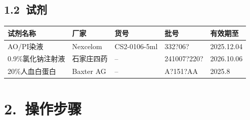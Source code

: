 \documentclass[UTF8,10pt,a4paper,fontset=fandol]{ctexart}
\newcommand{\fieldvalue}[1]{#1}
\newcommand{\handwritten}[1]{#1}
\begin{document}
\begin{center}
\begin{center}
\subsection*{1.2\ 试剂}

\noindent
\small
\begin{tabularx}{\textwidth}{|p{3.0cm}|p{2.4cm}|p{2.7cm}|p{2.7cm}|X|}
\hline
试剂名称 & 厂家 & 货号 & 批号 & 有效期至\\
\hline
\fieldvalue{AO/PI染液} &
\fieldvalue{Nexcelom} &
\fieldvalue{CS2-0106-5ml} &
\fieldvalue{\handwritten{332?06?}} &
\fieldvalue{\handwritten{2025.12.04}}\\
\hline
\fieldvalue{0.9\%氯化钠注射液} &
\fieldvalue{石家庄四药} &
\fieldvalue{--} &
\fieldvalue{\handwritten{241007?220?}} &
\fieldvalue{\handwritten{2026.10.06}}\\
\hline
\fieldvalue{20\%人血白蛋白} &
\fieldvalue{Baxter AG} &
\fieldvalue{--} &
\fieldvalue{\handwritten{A?151?AA}} &
\fieldvalue{\handwritten{2025.8}}\\
\hline
\end{tabularx}
\normalsize

\section*{2.\ 操作步骤}


\end{center}
\end{center}
\end{document}
